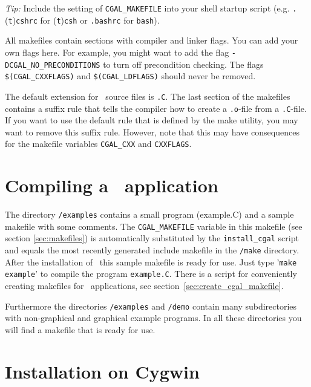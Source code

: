 \textit{Tip:} Include the setting of \texttt{CGAL\_MAKEFILE} into your
shell startup script (e.g. \texttt{.}(\texttt{t})\texttt{cshrc} for
(\texttt{t})\texttt{csh} or \texttt{.bashrc} for \texttt{bash}).

All makefiles contain sections with compiler and linker flags.  You
can add your own flags here. For example, you might want to add the
flag \texttt{-DCGAL\_NO\_PRECONDITIONS} to turn off precondition
checking. The flags \texttt{\$(CGAL\_CXXFLAGS)} and
\texttt{\$(CGAL\_LDFLAGS)} should never be removed.

The default extension for \cgal\ source files is \texttt{.C}.  The
last section of the makefiles contains a suffix rule that tells the
compiler how to create a \texttt{.o}-file from a \texttt{.C}-file.  If
you want to use the default rule that is defined by the make utility,
you may want to remove this suffix rule.  However, note that this may
have consequences for the makefile variables \texttt{CGAL\_CXX} and
\texttt{CXXFLAGS}.

\section{Compiling a \cgal\ application}

The directory \texttt{\cgaldir/examples} contains a small program
(example.C) and a sample makefile with some comments. The
\texttt{CGAL\_MAKEFILE} variable in this makefile (see section
\ref{sec:makefiles}) is automatically substituted by the
\texttt{install\_cgal} script and equals the most recently generated
include makefile in the \texttt{\cgaldir/make} directory. After the
installation of \cgal\ this sample makefile is ready for use. Just
type '\texttt{make example}' to compile the program
\texttt{example.C}. There is a script for conveniently creating
makefiles for \cgal\ applications, see
section~\ref{sec:create_cgal_makefile}.

Furthermore the directories \texttt{\cgaldir/examples} and
\texttt{\cgaldir/demo} contain many subdirectories with non-graphical
and graphical example programs.  In all these directories you will
find a makefile that is ready for use.

\section{Installation on Cygwin}\label{sec:cygwin}

